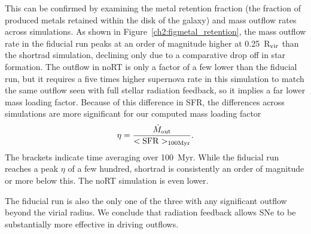This can be confirmed by examining the metal retention fraction (the fraction of produced metals retained within the disk of the galaxy) and mass outflow rates across simulations. As shown in Figure~\ref{ch2:figmetal_retention}, the mass outflow rate in the fiducial run peaks at an order of magnitude higher at 0.25~R$_{\rm vir}$ than the shortrad simulation, declining only due to a comparative drop off in star formation. The outflow in noRT is only a factor of a few lower than the fiducial run, but it requires a five times higher supernova rate in this simulation to match the same outflow seen with full stellar radiation feedback, so it implies a far lower mass loading factor. Because of this difference in SFR,
the differences across simulations are more significant for our computed mass loading factor
\begin{equation}
    \eta = \frac{ \dot{M}_{\rm out}}{ <\rm{SFR}>_{100 \rm{Myr}}}.
\end{equation} The brackets indicate time averaging over 100~Myr.
%
While the fiducial run reaches a peak $\eta$ of a few hundred, shortrad is consistently an order of magnitude or more below this. The noRT simulation is even lower.

The fiducial run is also the only one of the three with any significant outflow beyond the virial radius. We conclude that radiation feedback allows SNe to be substantially more effective in driving outflows.

